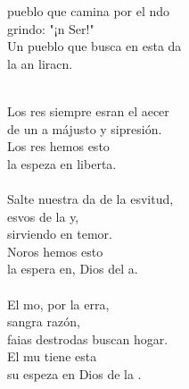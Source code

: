 \begin{cancion}%
	\begin{chorus}%
	pueblo que camina por el ndo\\
	grindo: "¡n Ser!" \\
	Un pueblo que busca en esta da\\
	la an liracn.\\
	\end{chorus}%
	\jump\\
	Los res siempre esran el aecer\\
	de un a májusto y sipresión.\\
	Los res hemos esto \\
	la espeza en  liberta.\\
\jump\\
	Salte nuestra da de la esvitud,\\
	esvos de la y, \\
	sirviendo en temor.\\
	Noros hemos esto \\
	la espera en, Dios del a.\\
\jump\\
	El mo, por la erra, \\
	sangra  razón,\\
	faias destrodas buscan hogar.\\
	El mu tiene esta \\
	su espeza en  Dios de la .\\
\end{cancion}%

